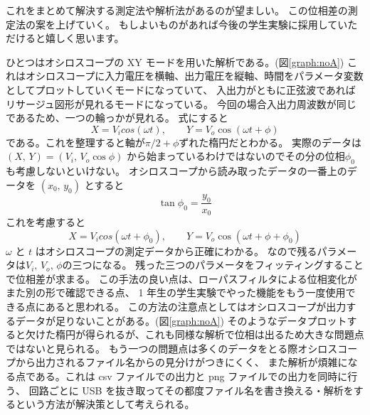 \documentclass[11pt,dvipdfmx,a4paper]{jsarticle}
\begin{document}
これをまとめて解決する測定法や解析法があるのが望ましい。
この位相差の測定法の案を上げていく。
もしよいものがあれば今後の学生実験に採用していただけると嬉しく思います。

ひとつはオシロスコープの XY モードを用いた解析である。(図\ref{graph:noA})
これはオシロスコープに入力電圧を横軸、出力電圧を縦軸、時間をパラメータ変数としてプロットしていくモードになっていて、
入出力がともに正弦波であればリサージュ図形が見れるモードになっている。
今回の場合入出力周波数が同じであるため、一つの輪っかが見れる。
式にすると
\begin{equation}
	X = V_{i}cos(\omega t),\qquad Y = V_{o}\cos(\omega t+\phi)
\end{equation}
である。これを整理すると軸が\(\pi/2+\phi\)ずれた楕円だとわかる。
実際のデータは\((X,\,Y) = (V_{i},\,V_{o}\cos\phi)\) から始まっているわけではないのでその分の位相\(\phi_0\)も考慮しないといけない。
オシロスコープから読み取ったデータの一番上のデータを \((x_0,\,y_0)\) とすると
\begin{equation}
	\tan\phi_0 = \frac{y_0}{x_0}
\end{equation}
これを考慮すると
\begin{equation}
	X = V_{i}cos(\omega t + \phi_0),\qquad Y = V_{o}\cos(\omega t + \phi + \phi_0)
\end{equation}
\(\omega\) と \(t\) はオシロスコープの測定データから正確にわかる。
なので残るパラメータは\(V_i,\,V_o,\,\phi\)の三つになる。
残った三つのパラメータをフィッティングすることで位相差が求まる。
この手法の良い点は、ローパスフィルタによる位相変化がまた別の形で確認できる点、
1 年生の学生実験でやった機能をもう一度使用できる点にあると思われる。
この方法の注意点としてはオシロスコープが出力するデータが足りないことがある。(図\ref{graph:noA})
そのようなデータプロットすると欠けた楕円が得られるが、これも同様な解析で位相は出るため大きな問題点ではないと見られる。
もう一つの問題点は多くのデータをとる際オシロスコープから出力されるファイル名からの見分けがつきにくく、
また解析が煩雑になる点である。これは csv ファイルでの出力と png ファイルでの出力を同時に行う、
回路ごとに USB を抜き取ってその都度ファイル名を書き換える・解析をするという方法が解決策として考えられる。
\end{document}
